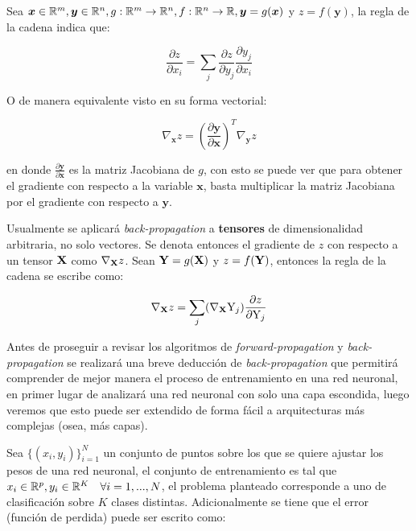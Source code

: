 Sea $\bm{x} \in \mathbb{R}^{m}, \bm{y} \in \mathbb{R}^{n}, g:\mathbb{R}^{m} \rightarrow \mathbb{R}^{n}, f:\mathbb{R}^{n} \rightarrow \mathbb{R}, \bm{y} = g(\bm{x})$ y $z = f(\bm{y})$, la regla de la cadena indica que:

\begin{equation}
\frac{\partial z}{\partial x_{i}} = \sum_{j}\frac{\partial z}{\partial y_{j}}\frac{\partial y_{j}}{\partial x_{i}}
\end{equation}

O de manera equivalente visto en su forma vectorial:

\begin{equation}
\nabla_{\bm{x}}z = (\frac{\partial \bm{y}}{\partial \bm{x}})^{T}\nabla_{\bm{y}}z
\end{equation}

en donde $\frac{\partial \bm{y}}{\partial \bm{x}}$ es la matriz Jacobiana de $g$, con esto se puede ver que para obtener el gradiente con respecto a la variable $\bm{x}$, basta multiplicar la matriz Jacobiana por el gradiente con respecto a $\bm{y}$.%


Usualmente se aplicar\'a \textit{back-propagation} a \textbf{tensores} de dimensionalidad arbitraria, no solo vectores. Se denota entonces el gradiente de $z$ con respecto a un tensor $\textrm{\textbf{X}}$ como $\nabla_{\textrm{\textbf{X}}}z$. Sean $\textrm{\textbf{Y}} = g(\textrm{\textbf{X}})$ y $z = f(\textrm{\textbf{Y}})$, entonces la regla de la cadena se escribe como:

\begin{equation}
\nabla_{\textrm{\textbf{X}}}z = \sum_{j}(\nabla_{\textrm{\textbf{X}}}\textrm{Y}_{j})\frac{\partial z}{\partial \textrm{Y}_{j}}
\end{equation}


Antes de proseguir a revisar los algoritmos de \textit{forward-propagation} y \textit{back-propagation} se realizará una breve deducción de \textit{back-propagation} que permitirá comprender de mejor manera el proceso de entrenamiento en una red neuronal, en primer lugar de analizará una red neuronal con solo una capa escondida, luego veremos que esto puede ser extendido de forma fácil a arquitecturas más complejas (osea, más capas).

Sea $\{ (x_i,y_i) \}_{i=1}^N$ un conjunto de puntos sobre los que se quiere ajustar los pesos de una red neuronal, el conjunto de entrenamiento es tal que  $x_i \in \mathbb{R}^p, y_i \in \mathbb{R}^K \quad \forall i=1,...,N$, el problema planteado corresponde a uno de clasificación sobre $K$ clases distintas. Adicionalmente se tiene que el error (función de perdida) puede ser escrito como:

